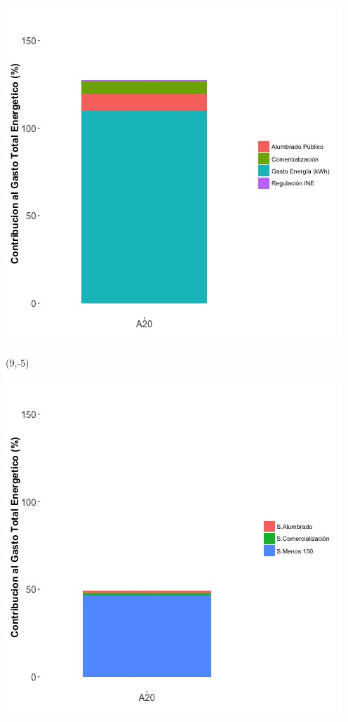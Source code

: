 \documentclass{article}\usepackage[]{graphicx}\usepackage[]{color}
\newenvironment{knitrout}{}{} %
\begin{document}
\begin{knitrout}
\color{fgcolor}
\includegraphics[scale=0.65]{figure/A20_costvars_plot.jpg} 
\end{knitrout}

 \begin{textblock}{1}(9,-5)
\begin{minipage}{20em}
\begingroup

\endgroup
\end{minipage}
\end{textblock}

\begin{knitrout}
\color{fgcolor}
\includegraphics[scale=0.65]{figure/A20_subvars_plot.jpg} 
\end{knitrout}
\end{document}
